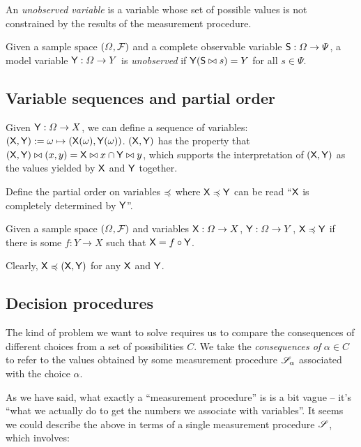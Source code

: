 An \emph{unobserved variable} is a variable whose set of possible values is not constrained by the results of the measurement procedure.

\begin{definition}\label{def:unobserved_variable}
Given a sample space $(\Omega,\mathcal{F})$ and a complete observable variable $\mathsf{S}:\Omega\to\Psi$, a model variable $\mathsf{Y}:\Omega\to Y$ is \emph{unobserved} if $\mathsf{Y}(\mathsf{S}\bowtie s)=Y$ for all $s\in \Psi$.
\end{definition}

\subsection{Variable sequences and partial order}

Given $\mathsf{Y}:\Omega\to X$, we can define a sequence of variables: $(\mathsf{X},\mathsf{Y}):=\omega\mapsto (\mathsf{X}(\omega),\mathsf{Y}(\omega))$. $(\mathsf{X},\mathsf{Y})$ has the property that $(\mathsf{X},\mathsf{Y})\bowtie (x,y)= \mathsf{X}\bowtie x\cap \mathsf{Y}\bowtie y$, which supports the interpretation of $(\mathsf{X},\mathsf{Y})$ as the values yielded by $\mathsf{X}$ and $\mathsf{Y}$ together.

Define the partial order on variables $\preccurlyeq$ where $\mathsf{X}\preccurlyeq \mathsf{Y}$ can be read ``$\mathsf{X}$ is completely determined by $\mathsf{Y}$''.

\begin{definition}\label{def:variable_po}
Given a sample space $(\Omega,\mathcal{F})$ and variables $\mathsf{X}:\Omega\to X$, $\mathsf{Y}:\Omega\to Y$, $\mathsf{X}\preccurlyeq \mathsf{Y}$ if there is some $f:Y\to X$ such that $\mathsf{X}=f\circ \mathsf{Y}$.
\end{definition}

Clearly, $\mathsf{X}\preccurlyeq(\mathsf{X},\mathsf{Y})$ for any $\mathsf{X}$ and $\mathsf{Y}$.

\subsection{Decision procedures}\label{sec:actions}

The kind of problem we want to solve requires us to compare the consequences of different choices from a set of possibilities $C$. We take the \emph{consequences of} $\alpha\in C$ to refer to the values obtained by some measurement procedure $\mathscr{S}_\alpha$ associated with the choice $\alpha$.

As we have said, what exactly a ``measurement procedure'' is is a bit vague -- it's ``what we actually do to get the numbers we associate with variables''. It seems we could describe the above in terms of a single measurement procedure $\mathscr{S}$, which involves:

